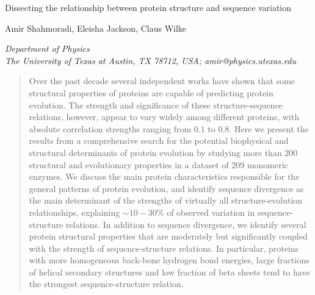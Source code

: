 \documentclass[11pt]{article}
\makeatletter
\newcommand\pubnumber{}
\newcommand\pubdate{\today}
\def\affiliation{Department of Physics \\
The University of Texas at Austin, TX 78712, USA; amir@physics.utexas.edu}
\def\Title#1{\begin{center} {\Large #1 } \end{center}}
\def\Author#1{\begin{center}{ \sc #1} \end{center}}
\def\Address#1{\begin{center}{ \it #1} \end{center}}
\newcommand\pubblock{\rightline{\begin{tabular}{l} \pubnumber\\
         \pubdate  \end{tabular}}}
\newenvironment{Abstract}{\begin{quotation}  }{\end{quotation}}
\makeatother
\begin{document}
\begin{titlepage}
\pubblock

\vfill
\Title{Dissecting the relationship between protein structure and sequence variation}
\vfill
\Author{Amir Shahmoradi, Eleisha Jackson, Claus Wilke}%
\Address{\affiliation}
\vfill
\begin{Abstract}
    Over the past decade several independent works have shown that some structural properties of proteins are capable of predicting protein evolution. The strength and significance of these structure-sequence relations, however, appear to vary widely among different proteins, with absolute correlation strengths ranging from $0.1$ to $0.8$. Here we present the results from a comprehensive search for the potential biophysical and structural determinants of protein evolution by studying more than $200$ structural and evolutionary properties in a dataset of $209$ monomeric enzymes. We discuss the main protein characteristics responsible for the general patterns of protein evolution, and identify sequence divergence as the main determinant of the strengths of virtually all structure-evolution relationships, explaining $\sim10-30\%$ of observed variation in sequence-structure relations. In addition to sequence divergence, we identify several protein structural properties that are moderately but significantly coupled with the strength of sequence-structure relations. In particular, proteins with more homogeneous back-bone hydrogen bond energies, large fractions of helical secondary structures and low fraction of beta sheets tend to have the strongest sequence-structure relation.

\end{Abstract}
\vfill
\vfill
\end{titlepage}
\def\thefootnote{\fnsymbol{footnote}}
\setcounter{footnote}{0}
%
\end{document}

